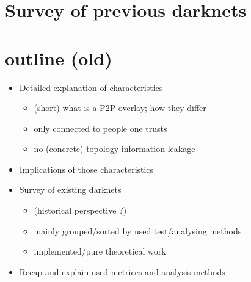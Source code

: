 \section{Survey of previous darknets}

\section{outline (old)}
\begin{itemize}
\item    Detailed explanation of characteristics
\begin{itemize}
\item        (short) what is a P2P overlay; how they differ
\item        only connected to people one trusts
\item        no (concrete) topology information leakage
\end{itemize}
\item    Implications of those characteristics
\item    Survey of existing darknets
\begin{itemize}
\item        (historical perspective ?)
\item        mainly grouped/sorted by used test/analysing methods
\item        implemented/pure theoretical work
\end{itemize}
\item    Recap and explain used metrices and analysis methods
\end{itemize}
